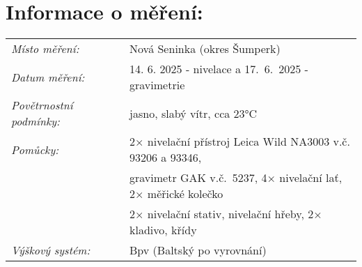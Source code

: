 \section{Informace o měření:}
\begin{tabular}{lll} 
\textit{Místo měření:} & & Nová Seninka (okres Šumperk)\\ 
\textit{Datum měření:} & & 14. 6. 2025 - nivelace a 17.~6.~2025 - gravimetrie\\
\textit{Povětrnostní podmínky:} & & jasno, slabý vítr, cca 23°C\\ 
\textit{Pomůcky:} & & 2× nivelační přístroj Leica Wild NA3003 v.č. 93206 a 93346,\\ 
& & gravimetr GAK v.č.~5237, 4× nivelační lať, 2× měřické kolečko\\
& & 2× nivelační stativ, nivelační hřeby, 2× kladivo, křídy\\ 
\textit{Výškový systém:} & & Bpv (Baltský po vyrovnání)\\ 
\end{tabular}
